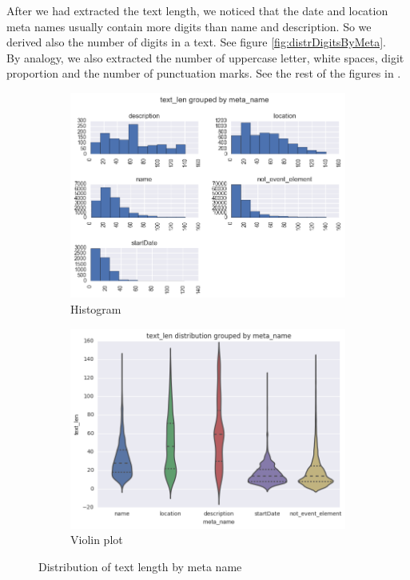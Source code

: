 After we had extracted the text length, we noticed that the date and location meta names usually contain more digits than name and description. So we derived also the number of digits in a text. See figure \ref{fig:distrDigitsByMeta}.\\

By analogy, we also extracted the number of uppercase letter, white spaces, digit proportion and the number of punctuation marks. See the rest of the figures in .

\begin{figure}[h]
\begin{subfigure}{.5\textwidth}
  \centering
  \includegraphics[width=1\textwidth]{figures07/distrTextByMeta}
  \caption{Histogram}
\end{subfigure}
\begin{subfigure}{.5\textwidth}
  \centering
  \includegraphics[width=1\textwidth]{figures07/distrTextByMeta_violin}
  \caption{Violin plot}
\end{subfigure}
\caption{Distribution of text length by meta name}
\label{fig:distrTextByMeta}
\end{figure}


